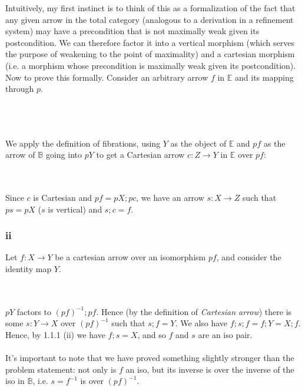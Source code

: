 \documentclass{article}
\begin{document}
Intuitively, my first instinct is to think of this as a formalization of the fact that any given arrow in the total category
(analogous to a derivation in a refinement system) may have a precondition that is not maximally weak given its postcondition.
We can therefore factor it into a vertical morphism (which serves the purpose of weakening to the point of maximality)
and a cartesian morphism (i.e. a morphism whose precondition is maximally weak given its postcondition). Now to prove this 
formally.
Consider an arbitrary arrow $f$ in $\mathbb E$ and its mapping through $p$.\\~\\
\\~\\
We apply the definition of fibrations, using $Y$ as the object of $\mathbb E$ and $pf$ as the arrow
of $\mathbb B$ going into $pY$ to get a Cartesian arrow $c : Z \to Y$ in $\mathbb E$ over $pf$:\\
\\~\\
Since $c$ is Cartesian and $pf = pX;pc$, we have an arrow $s : X \to Z$ such that $ps = pX$ ($s$ is vertical)
and $s;c = f$.

\subsubsection*{ii}

Let $f : X \to Y$ be a cartesian arrow over an isomorphism $pf$, and consider the identity map $Y$.\\
\\~\\
$pY$ factors to $(pf)^{-1};pf$. Hence (by the definition of \emph{Cartesian arrow}) there is some $s : Y \to X$
over $(pf)^{-1}$ such that $s;f = Y$. We also have $f;s;f = f;Y = X;f$. Hence, by 1.1.1 (ii) we have
$f;s = X$, and so $f$ and $s$ are an iso pair. 
\\~\\
It's important to note that we have proved something slightly stronger than the problem statement:
not only is $f$ an iso, but its inverse is over the inverse of the iso in $\mathbb B$, i.e.
$s = f^{-1}$ is over $(pf)^{-1}$.
\end{document}
